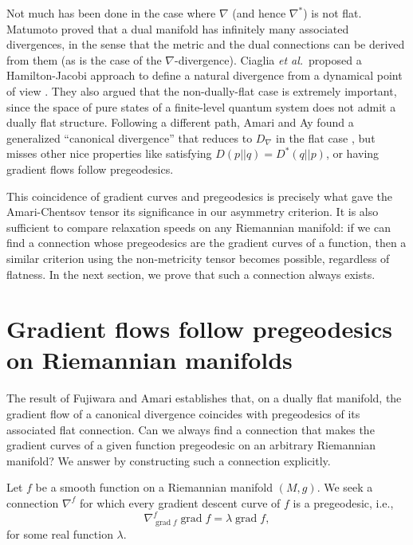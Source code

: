 \documentclass{amsart}
\theoremstyle{definition}
\begin{document}
Not much has been done in the case where $\nabla$ (and hence $\nabla^*$) is not flat. 
Matumoto proved \cite{matumoto_any_1993} that a dual manifold has infinitely many associated divergences, in the sense that the metric and the dual connections can be derived from them (as is the case of the $\nabla$-divergence). 
Ciaglia \textit{et al.}~proposed 
a Hamilton-Jacobi approach to define a natural divergence from a dynamical point of view \cite{ciaglia2017hamilton}.
They also argued that the non-dually-flat case is extremely important, 
since the space of pure states of a finite-level
quantum system does not admit a dually flat structure.
Following a different path, Amari and Ay found a generalized ``canonical divergence'' that reduces to $D_\nabla$ in the flat case \cite{ay_novel_2015}, but misses other nice properties like satisfying $D(p||q)=D^*(q||p)$, or having gradient flows follow pregeodesics.

This coincidence of gradient curves and pregeodesics is precisely what gave the Amari-Chentsov tensor its significance in our asymmetry criterion. It is also sufficient to compare relaxation speeds on any Riemannian manifold: if we can find a connection whose pregeodesics are the gradient curves of a function, then a similar criterion using the non-metricity tensor becomes possible, regardless of flatness. In the next section, we prove that such a connection always exists.


\section{Gradient flows follow pregeodesics on Riemannian manifolds\label{sec:asymmetricRM}}

The result of Fujiwara and Amari establishes that, on a dually flat manifold, the gradient flow of a canonical divergence coincides with pregeodesics of its associated flat connection. Can we always find a connection that makes the gradient curves of a given function pregeodesic on an arbitrary Riemannian manifold? We answer by constructing such a connection explicitly.

Let $f$ be a smooth function
on a Riemannian manifold $(M,g)$. 
We seek a connection $\nabla^f$ for which every gradient descent curve of $f$ is a pregeodesic, i.e.,
\begin{equation}\label{eq:gradientpregeodesic}
    \nabla^f_{\operatorname{grad}f}\operatorname{grad}f=\lambda \operatorname{grad }f,
\end{equation}
for some real function $\lambda$.
\end{document}

